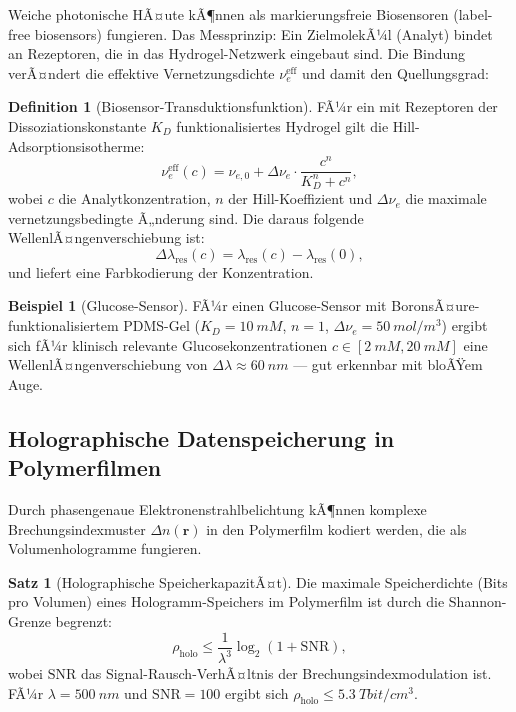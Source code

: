 ﻿\documentclass[a4paper,12pt]{article}
\theoremstyle{definition}
\newtheorem{definition}{Definition}[section]
\newtheorem{beispiel}{Beispiel}[section]
\newtheorem{satz}{Satz}[section]
\newcommand{\vect}[1]{\bm{#1}}
\begin{document}
	Weiche photonische HÃ¤ute kÃ¶nnen als markierungsfreie Biosensoren
	(label-free biosensors) fungieren. Das Messprinzip: Ein ZielmolekÃ¼l
	(Analyt) bindet an Rezeptoren, die in das Hydrogel-Netzwerk eingebaut sind.
	Die Bindung verÃ¤ndert die effektive Vernetzungsdichte $\nu_e^\mathrm{eff}$
	und damit den Quellungsgrad:
	
	\begin{definition}[Biosensor-Transduktionsfunktion]
		\label{def:biosensor}
		FÃ¼r ein mit Rezeptoren der Dissoziationskonstante $K_D$ funktionalisiertes
		Hydrogel gilt die Hill-Adsorptionsisotherme:
		\begin{equation}
			\nu_e^\mathrm{eff}(c) = \nu_{e,0} + \Delta\nu_e \cdot \frac{c^n}{K_D^n + c^n},
			\label{eq:hill}
		\end{equation}
		wobei $c$ die Analytkonzentration, $n$ der Hill-Koeffizient und
		$\Delta\nu_e$ die maximale vernetzungsbedingte Ã„nderung sind.
		Die daraus folgende WellenlÃ¤ngenverschiebung ist:
		\begin{equation}
			\Delta\lambda_\mathrm{res}(c) = \lambda_\mathrm{res}(c) - \lambda_\mathrm{res}(0),
			\label{eq:wellenlaengenverschiebung}
		\end{equation}
		und liefert eine Farbkodierung der Konzentration.
	\end{definition}
	
	\begin{beispiel}[Glucose-Sensor]
		FÃ¼r einen Glucose-Sensor mit BoronsÃ¤ure-funktionalisiertem PDMS-Gel
		($K_D = \SI{10}{mM}$, $n = 1$, $\Delta\nu_e = \SI{50}{mol/m^3}$)
		ergibt sich fÃ¼r klinisch relevante Glucosekonzentrationen
		$c \in [\SI{2}{mM}, \SI{20}{mM}]$ eine WellenlÃ¤ngenverschiebung von
		$\Delta\lambda \approx \SI{60}{nm}$ --- gut erkennbar mit bloÃŸem Auge.
	\end{beispiel}
	
	\subsection{Holographische Datenspeicherung in Polymerfilmen}
	
	Durch phasengenaue Elektronenstrahlbelichtung kÃ¶nnen komplexe
	Brechungsindexmuster $\Delta n(\vect{r})$ in den Polymerfilm kodiert werden,
	die als Volumenhologramme fungieren.
	
	\begin{satz}[Holographische SpeicherkapazitÃ¤t]
		\label{satz:holographie}
		Die maximale Speicherdichte (Bits pro Volumen) eines Hologramm-Speichers
		im Polymerfilm ist durch die Shannon-Grenze begrenzt:
		\begin{equation}
			\rho_\mathrm{holo} \leq \frac{1}{\lambda^3} \log_2(1 + \mathrm{SNR}),
			\label{eq:holo-kapazitaet}
		\end{equation}
		wobei $\mathrm{SNR}$ das Signal-Rausch-VerhÃ¤ltnis der Brechungsindexmodulation ist.
		FÃ¼r $\lambda = \SI{500}{nm}$ und $\mathrm{SNR} = 100$ ergibt sich
		$\rho_\mathrm{holo} \leq \SI{5.3}{Tbit/cm^3}$.
	\end{satz}
	
\end{document}
